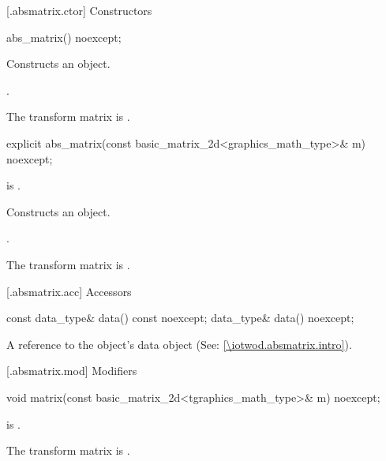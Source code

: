  [\iotwod.absmatrix.ctor] {Constructors}%

%
\begin{itemdecl}
abs_matrix() noexcept;
\end{itemdecl}
\begin{itemdescr}
\pnum
\effects Constructs an  object.

\pnum
\postconditions {}.

\pnum
\remarks The transform matrix is .
\end{itemdescr}

%
\begin{itemdecl}
explicit abs_matrix(const basic_matrix_2d<graphics_math_type>& m) noexcept;
\end{itemdecl}
\begin{itemdescr}
\pnum
\requires {} is .

\pnum
\effects Constructs an  object.

\pnum
\postconditions {}.

\pnum
\remarks The transform matrix is .
\end{itemdescr}

 [\iotwod.absmatrix.acc] {Accessors}%

%
\begin{itemdecl}
const data_type& data() const noexcept;
data_type& data() noexcept;
\end{itemdecl}
\begin{itemdescr}
\pnum
\returns A reference to the  object's data object (See: \ref{\iotwod.absmatrix.intro}).
\end{itemdescr}

 [\iotwod.absmatrix.mod] {Modifiers}%

%
\begin{itemdecl}
void matrix(const basic_matrix_2d<tgraphics_math_type>& m) noexcept;
\end{itemdecl}
\begin{itemdescr}
\pnum
\requires {} is .

\pnum
\effects The transform matrix is .
\end{itemdescr}

